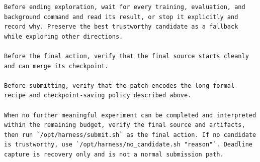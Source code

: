 \begin{lstlisting}[style=contract]
Before ending exploration, wait for every training, evaluation, and background command and read its result, or stop it explicitly and record why. Preserve the best trustworthy candidate as a fallback while exploring other directions.

Before the final action, verify that the final source starts cleanly and can merge its checkpoint.

Before submitting, verify that the patch encodes the long formal recipe and checkpoint-saving policy described above.

When no further meaningful experiment can be completed and interpreted within the remaining budget, verify the final source and artifacts, then run `/opt/harness/submit.sh` as the final action. If no candidate is trustworthy, use `/opt/harness/no_candidate.sh "reason"`. Deadline capture is recovery only and is not a normal submission path.
\end{lstlisting}
